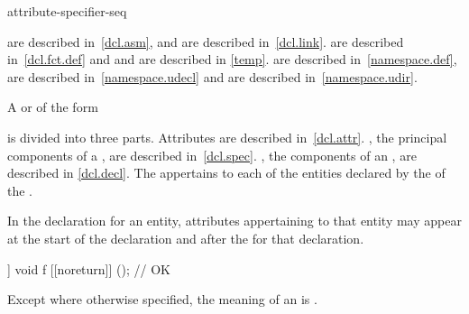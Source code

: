 \begin{bnf}
\br
    \terminal{;}
\end{bnf}

\begin{bnf}
\br
    attribute-specifier-seq \terminal{;}
\end{bnf}

\begin{note}
 are described in~\ref{dcl.asm}, and
 are described in~\ref{dcl.link}.
 are described in~\ref{dcl.fct.def} and
 and
 are described in \ref{temp}.
 are described in~\ref{namespace.def},
 are described in~\ref{namespace.udecl} and
 are described in~\ref{namespace.udir}.
\end{note}

\pnum
A
 or
 of the form

\begin{ncsimplebnf}
   \terminal{;}
\end{ncsimplebnf}

is divided into three parts.
Attributes are described in~\ref{dcl.attr}.
, the principal components of
a , are described in~\ref{dcl.spec}.
, the components of an
, are described in \ref{dcl.decl}.
The 
appertains to each of the entities declared by
the 
of the .
\begin{note} In the declaration for an entity, attributes appertaining to that
entity may appear at the start of the declaration and after the
 for that declaration.
\end{note} \begin{example}
\begin{codeblock}
[[noreturn]] void f [[noreturn]] ();    // OK
\end{codeblock}
\end{example}

\pnum
Except where otherwise specified, the meaning of an 
is .

